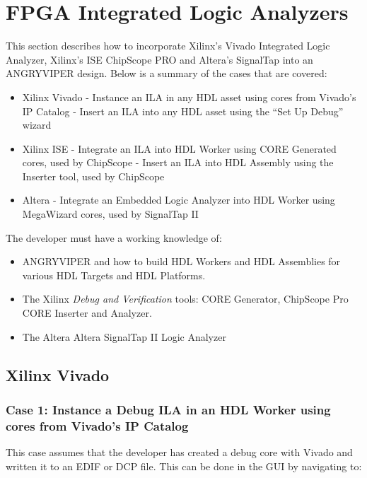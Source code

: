 \section{FPGA Integrated Logic Analyzers}

\begin{flushleft}

	This section describes how to incorporate Xilinx's Vivado Integrated Logic Analyzer, Xilinx's ISE ChipScope PRO and Altera's SignalTap into an ANGRYVIPER design. Below is a summary of the cases that are covered:

	\begin{itemize}
		\item Xilinx Vivado
			\subitem - Instance an ILA in any HDL asset using cores from Vivado's IP Catalog
			\subitem - Insert an ILA into any HDL asset using the ``Set Up Debug'' wizard
	 	\item Xilinx ISE
	 		\subitem - Integrate an ILA into HDL Worker using CORE Generated cores, used by ChipScope
		 	\subitem - Insert an ILA into HDL Assembly using the Inserter tool, used by ChipScope
	 	\item Altera
	 		\subitem - Integrate an Embedded Logic Analyzer into HDL Worker using MegaWizard cores, used by SignalTap II
	\end{itemize}

	The developer must have a working knowledge of:
	\begin{itemize}
	 	\item ANGRYVIPER and how to build HDL Workers and HDL Assemblies for various HDL Targets and HDL Platforms.
		\item The Xilinx \textit{Debug and Verification} tools: CORE Generator, ChipScope Pro CORE Inserter and Analyzer.
		\item The Altera Altera SignalTap II Logic Analyzer
	\end{itemize}

\newpage

\subsection{Xilinx Vivado}
	\subsubsection{Case 1: Instance a Debug ILA in an HDL Worker using cores from Vivado's IP Catalog}
	This case assumes that the developer has created a debug core with Vivado and written it to an EDIF or DCP file. This can be done in the GUI by navigating to:\newline {} \newline


\end{flushleft}
